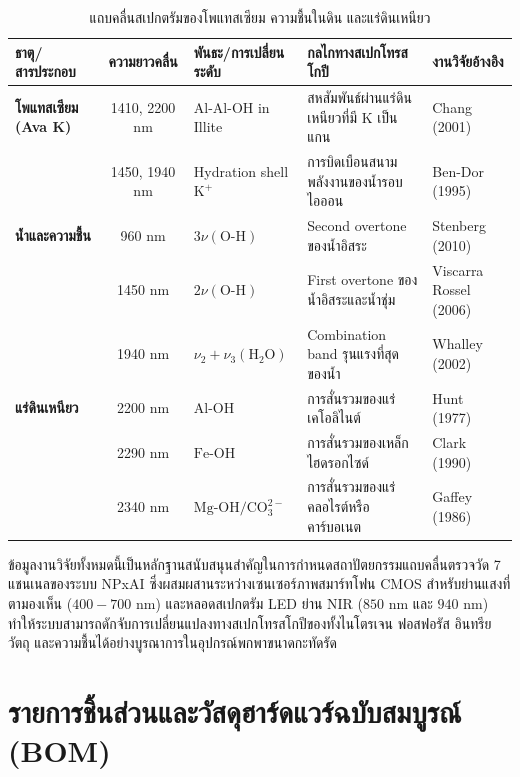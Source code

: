 \documentclass[12pt,a4paper,oneside]{book}
\begin{document}
\begin{table}[ht]
\caption{แถบคลื่นสเปกตรัมของโพแทสเซียม ความชื้นในดิน และแร่ดินเหนียว}\label{tab:spectral_k_water}
\centering
\small
\begin{tabularx}{\textwidth}{p{2.3cm}cp{3.0cm}p{3.5cm}Y}
\toprule
\textbf{ธาตุ/สารประกอบ} & \textbf{ความยาวคลื่น} & \textbf{พันธะ/การเปลี่ยนระดับ} & \textbf{กลไกทางสเปกโทรสโกปี} & \textbf{งานวิจัยอ้างอิง} \\
\midrule
\textbf{โพแทสเซียม (Ava K)} & 1410, 2200 nm & $\text{Al-Al-OH}$ in Illite & สหสัมพันธ์ผ่านแร่ดินเหนียวที่มี K เป็นแกน & Chang (2001) \\
& 1450, 1940 nm & Hydration shell $\text{K}^+$ & การบิดเบือนสนามพลังงานของน้ำรอบไอออน & Ben-Dor (1995) \\
\midrule
\textbf{น้ำและความชื้น} & 960 nm & $3\nu(\text{O-H})$ & Second overtone ของน้ำอิสระ & Stenberg (2010) \\
& 1450 nm & $2\nu(\text{O-H})$ & First overtone ของน้ำอิสระและน้ำชุ่ม & Viscarra Rossel (2006) \\
& 1940 nm & $\nu_2 + \nu_3(\text{H}_2\text{O})$ & Combination band รุนแรงที่สุดของน้ำ & Whalley (2002) \\
\midrule
\textbf{แร่ดินเหนียว} & 2200 nm & $\text{Al-OH}$ & การสั่นรวมของแร่เคโอลิไนต์ & Hunt (1977) \\
& 2290 nm & $\text{Fe-OH}$ & การสั่นรวมของเหล็กไฮดรอกไซด์ & Clark (1990) \\
& 2340 nm & $\text{Mg-OH} / \text{CO}_3^{2-}$ & การสั่นรวมของแร่คลอไรต์หรือคาร์บอเนต & Gaffey (1986) \\
\bottomrule
\end{tabularx}
\end{table}

ข้อมูลงานวิจัยทั้งหมดนี้เป็นหลักฐานสนับสนุนสำคัญในการกำหนดสถาปัตยกรรมแถบคลื่นตรวจวัด 7 แชนเนลของระบบ NPxAI ซึ่งผสมผสานระหว่างเซนเซอร์ภาพสมาร์ทโฟน CMOS สำหรับย่านแสงที่ตามองเห็น ($400 - 700\text{ nm}$) และหลอดสเปกตรัม LED ย่าน NIR ($850\text{ nm}$ และ $940\text{ nm}$) ทำให้ระบบสามารถดักจับการเปลี่ยนแปลงทางสเปกโทรสโกปีของทั้งไนโตรเจน ฟอสฟอรัส อินทรียวัตถุ และความชื้นได้อย่างบูรณาการในอุปกรณ์พกพาขนาดกะทัดรัด

\appendix
\renewcommand{\thechapter}{ก}

\chapter{รายการชิ้นส่วนและวัสดุฮาร์ดแวร์ฉบับสมบูรณ์ (BOM)}
\end{document}
